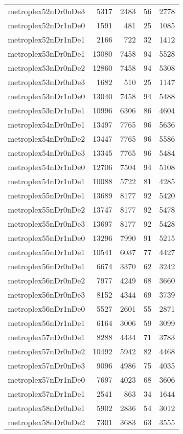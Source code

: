 \begin{longtable}{lrrrr}
metroplex52nDr0nDe3 & 5317 & 2483 & 56 & 2778 \\
metroplex52nDr1nDe0 & 1591 & 481 & 25 & 1085 \\
metroplex52nDr1nDe1 & 2166 & 722 & 32 & 1412 \\
metroplex53nDr0nDe1 & 13080 & 7458 & 94 & 5528 \\
metroplex53nDr0nDe2 & 12860 & 7458 & 94 & 5308 \\
metroplex53nDr0nDe3 & 1682 & 510 & 25 & 1147 \\
metroplex53nDr1nDe0 & 13040 & 7458 & 94 & 5488 \\
metroplex53nDr1nDe1 & 10996 & 6306 & 86 & 4604 \\
metroplex54nDr0nDe1 & 13497 & 7765 & 96 & 5636 \\
metroplex54nDr0nDe2 & 13447 & 7765 & 96 & 5586 \\
metroplex54nDr0nDe3 & 13345 & 7765 & 96 & 5484 \\
metroplex54nDr1nDe0 & 12706 & 7504 & 94 & 5108 \\
metroplex54nDr1nDe1 & 10088 & 5722 & 81 & 4285 \\
metroplex55nDr0nDe1 & 13689 & 8177 & 92 & 5420 \\
metroplex55nDr0nDe2 & 13747 & 8177 & 92 & 5478 \\
metroplex55nDr0nDe3 & 13697 & 8177 & 92 & 5428 \\
metroplex55nDr1nDe0 & 13296 & 7990 & 91 & 5215 \\
metroplex55nDr1nDe1 & 10541 & 6037 & 77 & 4427 \\
metroplex56nDr0nDe1 & 6674 & 3370 & 62 & 3242 \\
metroplex56nDr0nDe2 & 7977 & 4249 & 68 & 3660 \\
metroplex56nDr0nDe3 & 8152 & 4344 & 69 & 3739 \\
metroplex56nDr1nDe0 & 5527 & 2601 & 55 & 2871 \\
metroplex56nDr1nDe1 & 6164 & 3006 & 59 & 3099 \\
metroplex57nDr0nDe1 & 8288 & 4434 & 71 & 3783 \\
metroplex57nDr0nDe2 & 10492 & 5942 & 82 & 4468 \\
metroplex57nDr0nDe3 & 9096 & 4986 & 75 & 4035 \\
metroplex57nDr1nDe0 & 7697 & 4023 & 68 & 3606 \\
metroplex57nDr1nDe1 & 2541 & 863 & 34 & 1644 \\
metroplex58nDr0nDe1 & 5902 & 2836 & 54 & 3012 \\
metroplex58nDr0nDe2 & 7301 & 3683 & 63 & 3555 \\

\end{longtable}
